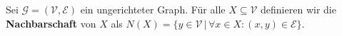 \begin{definition}[Nachbarschaft]\label{def:nachbarschaft}
Sei $\mathcal{G} = (\mathcal{V}, \mathcal{E})$ ein ungerichteter Graph.
Für alle $X \subseteq \mathcal{V}$ definieren wir die \textbf{Nachbarschaft}
von $X$ als $N(X) = \{y \in \mathcal{V} \,|\, \forall x \in X : (x, y) \in \mathcal{E}\}$.\textnormal{\cite[S.~735, Übung]{cormen:matchings}}
\end{definition}
